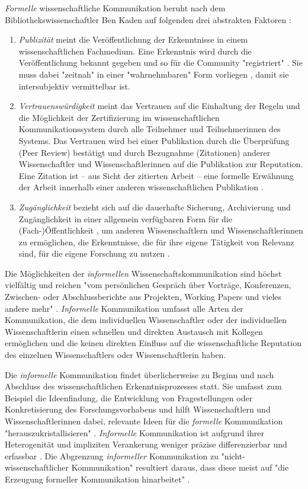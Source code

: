 \textit{Formelle} wissenschaftliche Kommunikation beruht nach dem Bibliothekswissenschaftler Ben Kaden auf folgenden drei abstrakten Faktoren \cite{Kaden_2009}:
\begin{enumerate}
\item \textit{Publizität} meint die Veröffentlichung der Erkenntnisse in einem wissenschaftlichen Fachmedium. Eine Erkenntnis wird durch die Veröffentlichung bekannt gegeben und so für die Community "registriert" \cite{Kaden_2009} \cite[:5]{Seidenfaden_2005}. Sie muss dabei "zeitnah" in einer "wahrnehmbaren" Form vorliegen \cite{Schimank_2012}, damit sie intersubjektiv vermittelbar ist.
\item \textit{Vertrauenswürdigkeit} meint das Vertrauen auf die Einhaltung der Regeln und die Möglichkeit der Zertifizierung \cite[:6]{Seidenfaden_2005} im wissenschaftlichen Kommunikationssystem durch alle Teilnehmer und Teilnehmerinnen des Systems. Das Vertrauen wird bei einer Publikation durch die Überprüfung (Peer Review) bestätigt und durch Bezugnahme (Zitationen) anderer Wissenschaftler und Wissenschaftlerinnen auf die Publikation zur Reputation. Eine Zitation ist – aus Sicht der zitierten Arbeit – eine formelle Erwähnung der Arbeit innerhalb einer anderen wissenschaftlichen Publikation \cite{Weller_2011}.
\item \textit{Zugänglichkeit} bezieht sich auf die dauerhafte Sicherung, Archivierung \cite[:6]{Seidenfaden_2005} und Zugänglichkeit in einer allgemein verfügbaren Form für die (Fach-)Öffentlichkeit \cite{Naeder_2010}, um anderen Wissenschaftlern und Wissenschaftlerinnen zu ermöglichen, die Erkenntnisse, die für ihre eigene Tätigkeit von Relevanz sind, für die eigene Forschung zu nutzen \cite[:6]{Seidenfaden_2005}.
\end{enumerate}

Die Möglichkeiten der \textit{informellen} Wissenschaftskommunikation sind höchst vielfältig und reichen "vom persönlichen Gespräch über Vorträge, Konferenzen, Zwischen- oder Abschlussberichte aus Projekten, Working Papers und vieles andere mehr" \cite{Hanekop_2014}. \textit{Informelle} Kommunikation umfasst alle Arten der Kommunikation, die dem individuellen Wissenschaftler oder der individuellen Wissenschaftlerin einen schnellen und direkten Austausch mit Kollegen ermöglichen und die keinen direkten Einfluss auf die wissenschaftliche Reputation des einzelnen Wissenschaftlers oder Wissenschaftlerin haben.

Die \textit{informelle} Kommunikation findet überlicherweise zu Beginn und nach Abschluss des wissenschaftlichen Erkenntnisprozesses statt. Sie umfasst zum Beispiel die Ideenfindung, die Entwicklung von Fragestellungen oder Konkretisierung des Forschungsvorhabens und hilft Wissenschaftlern und Wissenschaftlerinnen dabei, relevante Ideen für die \textit{formelle} Kommunikation "herauszukristallisieren" \cite{Hanekop_2014}. \textit{Informelle} Kommunikation ist aufgrund ihrer Heterogenität und impliziten Verankerung weniger präzise differenzierbar und erfassbar \cite{Kaden_2009}. Die Abgrenzung \textit{informeller} Kommunikation zu "nicht-wissenschaftlicher Kommunikation" resultiert daraus, dass diese meist auf "die Erzeugung formeller Kommunikation hinarbeitet" \cite{Kaden_2009}.

